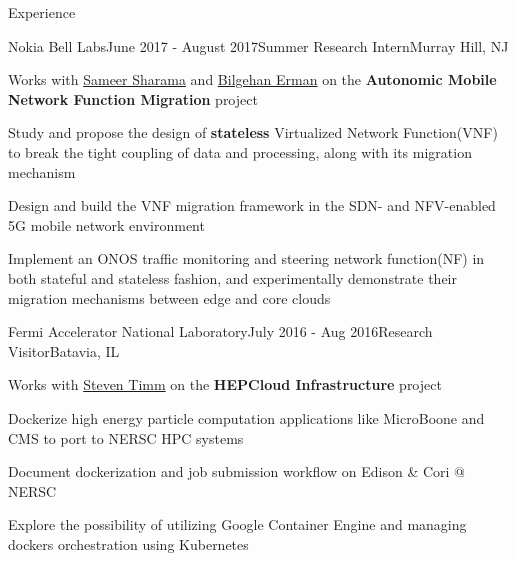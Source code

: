 \documentclass{resume} %
\begin{document}
\begin{rSection}{Experience}

\begin{rSubsection}{Nokia Bell Labs}{June 2017 - August 2017}{Summer Research Intern}{Murray Hill, NJ}
\item Works with \href{https://www.bell-labs.com/usr/sameer.sharma}{Sameer Sharama} and \href{https://www.bell-labs.com/usr/bilgehan.erman}{Bilgehan Erman} on the \textbf{Autonomic Mobile Network Function Migration} project
\item Study and propose the design of \textbf{stateless} Virtualized Network Function(VNF) to break the tight coupling of data and processing, along with its migration mechanism
\item Design and build the VNF migration framework in the SDN- and NFV-enabled 5G mobile network environment
\item Implement an ONOS traffic monitoring and steering network function(NF) in both stateful and stateless fashion, and experimentally demonstrate their migration mechanisms between edge and core clouds
\end{rSubsection}


\begin{rSubsection}{Fermi Accelerator National Laboratory}{July 2016 - Aug 2016}{Research Visitor}{Batavia, IL}
\item Works with \href{http://home.fnal.gov/~timm/}{Steven Timm} on the \textbf{HEPCloud Infrastructure} project
\item Dockerize high energy particle computation applications like MicroBoone and CMS to port to NERSC HPC systems
\item Document dockerization and job submission workflow on Edison \& Cori @ NERSC
\item Explore the possibility of utilizing Google Container Engine and managing dockers orchestration using Kubernetes
\end{rSubsection}


\end{rSection}
\end{document}
